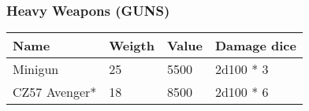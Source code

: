 
\subsubsection{Heavy Weapons (GUNS)}
\begin{longtable}{|p{4cm}|p{1.5cm}|p{1.5cm}|p{9cm}|}
\hline
\bfseries Name & \bfseries Weigth & \bfseries Value & \bfseries Damage dice \\
\hline
Minigun  & 25 & 5500 & 2d100 *  3 \\
CZ57 Avenger*  & 18 & 8500 & 2d100 *  6 \\
\hline
\end{longtable}
